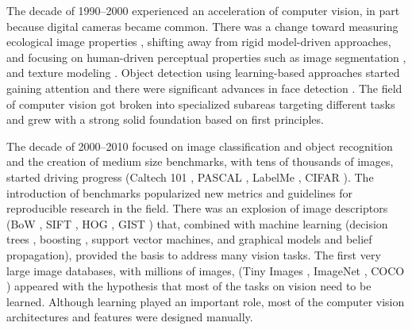 The decade of 1990--2000 experienced an acceleration of computer vision, in part because digital cameras became common. There was a change toward measuring ecological image properties \cite{Gibson1979}, shifting away from rigid model-driven approaches, and focusing on human-driven perceptual properties such as image segmentation \cite{Shi00}, and texture modeling \cite{Bergen88,Malik90}. Object detection using learning-based approaches started gaining attention and there were significant advances in face detection \cite{Rowley1996,Leung1995,Moghaddam97}. The field of computer vision got broken into specialized subareas targeting different tasks and grew with a strong solid foundation based on first principles.


The decade of 2000--2010 focused on image classification and object recognition \cite{Viola01,Fergus07,Dalal2005,Felzenszwalb2010} and the creation of medium size benchmarks, with tens of thousands of images, started driving progress (Caltech 101 \cite{caltech101}, PASCAL \cite{Everingham2010}, LabelMe \cite{Russell2008}, CIFAR \cite{cifar100}). The introduction of benchmarks popularized new metrics and guidelines for reproducible research in the field. There was an explosion of image descriptors (BoW \cite{Csurka2004}, SIFT \cite{Lowe04}, HOG \cite{Dalal2005}, GIST \cite{oliva01}) that, combined with machine learning (decision trees \cite{Lepetit2006}, boosting \cite{Tieu00}, support vector machines, and graphical models and belief propagation), provided the basis to address many vision tasks. The first very large image databases, with millions of images, (Tiny Images \cite{torralba2008}, ImageNet \cite{russakovsky2015imagenet}, COCO \cite{lin2014microsoft}) appeared with the hypothesis that most of the tasks on vision need to be learned. Although learning played an important role, most of the computer vision architectures and features were designed manually.

